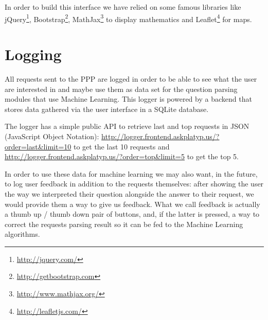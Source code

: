 In order to build this interface we have relied on some famous libraries 
like jQuery\footnote{\url{http://jquery.com/}}, Bootstrap\footnote{\url{http://getbootstrap.com}}, MathJax\footnote{\url{http://www.mathjax.org/}} to display mathematics and Leaflet\footnote{\url{http://leafletjs.com/}} for maps.

\section{Logging}

All requests sent to the PPP are logged in order to be able to see what
the user are interested in and maybe use them as data set for the
question parsing modules that use Machine Learning. This logger
is powered by a backend that stores data
gathered via the user interface in a SQLite database.

The logger has a simple public API to retrieve last and top requests
in JSON (JavaScript Object Notation):
\url{http://logger.frontend.askplatyp.us/?order=last&limit=10} to get the
last 10 requests and \url{http://logger.frontend.askplatyp.us/?order=top&limit=5}
to get the top 5.

In order to use these data for machine learning we may also want, in the future,
to log user feedback in addition to the requests
themselves: after showing the user the way we interpreted their
question alongside the answer to their request, we would provide them a
way to give us feedback.
What we call feedback is actually a thumb up / thumb down pair of
buttons, and, if the latter is pressed, a way to correct the requests
parsing result so it can be fed to the Machine Learning algorithms.
